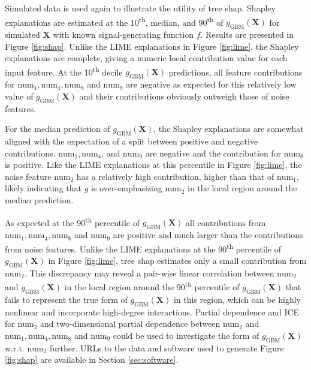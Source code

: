 \documentclass[11pt]{asaproc}
\begin{document}
Simulated data is used again to illustrate the utility of tree shap. Shapley explanations are estimated at the 10\textsuperscript{th}, median, and 90\textsuperscript{th} of $g_{\text{GBM}}(\mathbf{X})$ for simulated $\mathbf{X}$ with known signal-generating function $f$. Results are presented in Figure \ref{fig:shap}. Unlike the LIME explanations in Figure \ref{fig:lime}, the Shapley explanations are complete, giving a numeric local contribution value for each input feature. At the 10\textsuperscript{th} decile $g_{\text{GBM}}(\mathbf{X})$ predictions, all feature contributions for $\text{num}_1, \text{num}_4, \text{num}_8$ and $\text{num}_9$ are negative as expected for this relatively low value of $g_{\text{GBM}}(\mathbf{X})$ and their contributions obviously outweigh those of noise features.

For the median prediction of $g_{\text{GBM}}(\mathbf{X})$, the Shapley explanations are somewhat aligned with the expectation of a split between positive and negative contributions. $\text{num}_1, \text{num}_4$, and $\text{num}_9$ are negative and the contribution for $\text{num}_8$ is positive. Like the LIME explanations at this percentile in Figure \ref{fig:lime}, the noise feature $\text{num}_2$ has a relatively high contribution, higher than that of $\text{num}_1$, likely indicating that $g$ is over-emphasizing $\text{num}_2$ in the local region around the median prediction. 

As expected at the 90\textsuperscript{th} percentile of $g_{\text{GBM}}(\mathbf{X})$ all contributions from $\text{num}_1, \text{num}_4, \text{num}_8$ and $\text{num}_9$ are positive and much larger than the contributions from noise features. Unlike the LIME explanations at the 90\textsuperscript{th} percentile of $g_{\text{GBM}}(\mathbf{X})$ in Figure \ref{fig:lime}, tree shap estimates only a small contribution from $\text{num}_2$. This discrepancy may reveal a pair-wise linear correlation between $\text{num}_2$ and $g_{\text{GBM}}(\mathbf{X})$ in the local region around the 90\textsuperscript{th} percentile of $g_{\text{GBM}}(\mathbf{X})$ that fails to represent the true form of $g_{\text{GBM}}(\mathbf{X})$ in this region, which can be highly nonlinear and incorporate high-degree interactions. Partial dependence and ICE for $\text{num}_2$ and two-dimensional partial dependence between $\text{num}_2$ and $\text{num}_1, \text{num}_4, \text{num}_8$ and $\text{num}_9$ could be used to investigate the form of $g_{\text{GBM}}(\mathbf{X})$ w.r.t. $\text{num}_2$ further. URLs to the data and software used to generate Figure \ref{fig:shap} are available in Section \ref{sec:software}.
\end{document}
